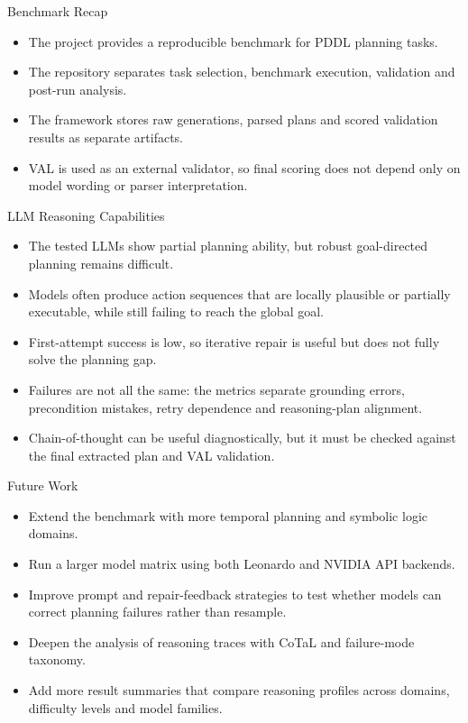\documentclass{beamer}
\begin{document}
\begin{frame}{Benchmark Recap}\footnotesize
    \begin{itemize}
        \item The project provides a reproducible benchmark for PDDL planning tasks.
        \item The repository separates task selection, benchmark execution, validation and post-run analysis.
        \item The framework stores raw generations, parsed plans and scored validation results as separate artifacts.
        \item VAL is used as an external validator, so final scoring does not depend only on model wording or parser interpretation.
    \end{itemize}
\end{frame}

\begin{frame}{LLM Reasoning Capabilities}\footnotesize
    \begin{itemize}
        \item The tested LLMs show partial planning ability, but robust goal-directed planning remains difficult.
        \item Models often produce action sequences that are locally plausible or partially executable, while still failing to reach the global goal.
        \item First-attempt success is low, so iterative repair is useful but does not fully solve the planning gap.
        \item Failures are not all the same: the metrics separate grounding errors, precondition mistakes, retry dependence and reasoning-plan alignment.
        \item Chain-of-thought can be useful diagnostically, but it must be checked against the final extracted plan and VAL validation.
    \end{itemize}
\end{frame}

\begin{frame}{Future Work}\footnotesize
    \begin{itemize}
        \item Extend the benchmark with more temporal planning and symbolic logic domains.
        \item Run a larger model matrix using both Leonardo and NVIDIA API backends.
        \item Improve prompt and repair-feedback strategies to test whether models can correct planning failures rather than resample.
        \item Deepen the analysis of reasoning traces with CoTaL and failure-mode taxonomy.
        \item Add more result summaries that compare reasoning profiles across domains, difficulty levels and model families.
    \end{itemize}
\end{frame}
\end{document}
